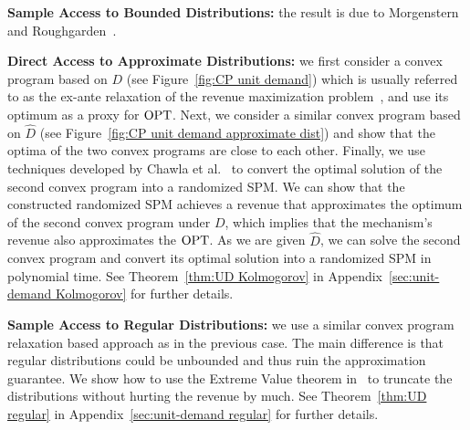 \noindent\textbf{Sample Access to Bounded Distributions:} the result is due to Morgenstern and Roughgarden~\cite{MorgensternR16}. 

\vspace{.05in}
\noindent\textbf{Direct Access to Approximate Distributions:} we first consider a convex program based on $D$ (see Figure~\ref{fig:CP unit demand}) which is usually referred to as the ex-ante relaxation of the revenue maximization problem~\cite{Alaei11}, and use its optimum as a proxy for $\text{OPT}$. Next, we consider a similar convex program based on $\hat{D}$ (see Figure~\ref{fig:CP unit demand approximate dist}) and show that the optima of the two convex programs are close to each other. Finally, we use techniques developed by Chawla et al.~\cite{ChawlaHMS10} to convert the optimal solution of the second convex program into a randomized SPM. We can show that the constructed randomized SPM achieves a revenue that approximates the optimum of the second convex program under $D$, which implies that the mechanism's revenue  also approximates the $\text{OPT}$. As we are given $\hat{D}$, we can solve the second convex program and convert its optimal solution into a randomized SPM in polynomial time. See Theorem~\ref{thm:UD Kolmogorov} in Appendix~\ref{sec:unit-demand Kolmogorov} for further details.

\vspace{.05in}
\noindent\textbf{Sample Access to Regular Distributions:} we use a similar convex program relaxation based approach as in the previous case. The main difference is that regular distributions could be unbounded and thus ruin the approximation guarantee. We show how to use the Extreme Value theorem in~\cite{CaiD11b} to truncate the distributions without hurting the revenue by much. See Theorem~\ref{thm:UD regular} in Appendix~\ref{sec:unit-demand regular} for further details.